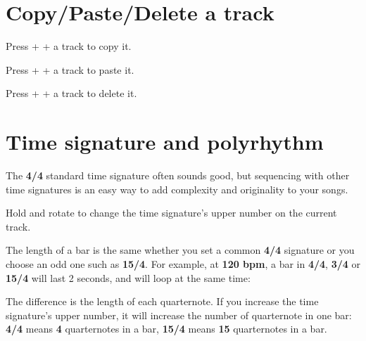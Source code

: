 \section{Copy/Paste/Delete a track}

Press  +  + a track \stepbystepicon{} to copy it.

Press  +  + a track \stepbystepicon{} to paste it.


Press  +  + a track \stepbystepicon{} to delete it.


\section{Time signature and polyrhythm}

The \textbf{4/4} standard time signature often sounds good, but sequencing with other time signatures is an easy way to add complexity and originality to your songs.


Hold  and rotate \encodericon{} to change the time signature's upper number on the current track.

The length of a bar is the same whether you set a common \textbf{4/4} signature or you choose an odd one such as \textbf{15/4}. For example, at \textbf{120 bpm}, a bar in \textbf{4/4}, \textbf{3/4} or \textbf{15/4} will last 2 seconds, and will loop at the same time:


The difference is the length of each quarternote. If you increase the time signature's upper number, it will increase the number of quarternote in one bar: \textbf{4/4} means \textbf{4} quarternotes in a bar, \textbf{15/4} means \textbf{15} quarternotes in a bar.



